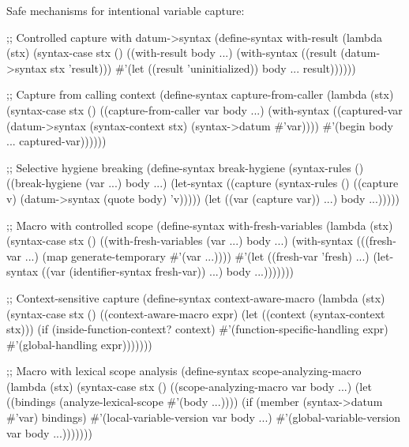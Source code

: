 
Safe mechanisms for intentional variable capture:

\begin{example}
\begin{lambdustcode}
;; Controlled capture with datum->syntax
(define-syntax with-result
  (lambda (stx)
    (syntax-case stx ()
      ((with-result body ...)
       (with-syntax ((result (datum->syntax stx 'result)))
         #'(let ((result 'uninitialized))
             body ...
             result))))))

;; Capture from calling context
(define-syntax capture-from-caller
  (lambda (stx)
    (syntax-case stx ()
      ((capture-from-caller var body ...)
       (with-syntax ((captured-var (datum->syntax (syntax-context stx) (syntax->datum #'var))))
         #'(begin body ... captured-var))))))

;; Selective hygiene breaking
(define-syntax break-hygiene
  (syntax-rules ()
    ((break-hygiene (var ...) body ...)
     (let-syntax ((capture (syntax-rules ()
                            ((capture v) (datum->syntax (quote body) 'v)))))
       (let ((var (capture var)) ...)
         body ...)))))

;; Macro with controlled scope
(define-syntax with-fresh-variables
  (lambda (stx)
    (syntax-case stx ()
      ((with-fresh-variables (var ...) body ...)
       (with-syntax (((fresh-var ...) (map generate-temporary #'(var ...))))
         #'(let ((fresh-var 'fresh) ...)
             (let-syntax ((var (identifier-syntax fresh-var)) ...)
               body ...)))))))

;; Context-sensitive capture
(define-syntax context-aware-macro
  (lambda (stx)
    (syntax-case stx ()
      ((context-aware-macro expr)
       (let ((context (syntax-context stx)))
         (if (inside-function-context? context)
             #'(function-specific-handling expr)
             #'(global-handling expr)))))))

;; Macro with lexical scope analysis
(define-syntax scope-analyzing-macro
  (lambda (stx)
    (syntax-case stx ()
      ((scope-analyzing-macro var body ...)
       (let ((bindings (analyze-lexical-scope #'(body ...))))
         (if (member (syntax->datum #'var) bindings)
             #'(local-variable-version var body ...)
             #'(global-variable-version var body ...)))))))
\end{lambdustcode}
\end{example}

